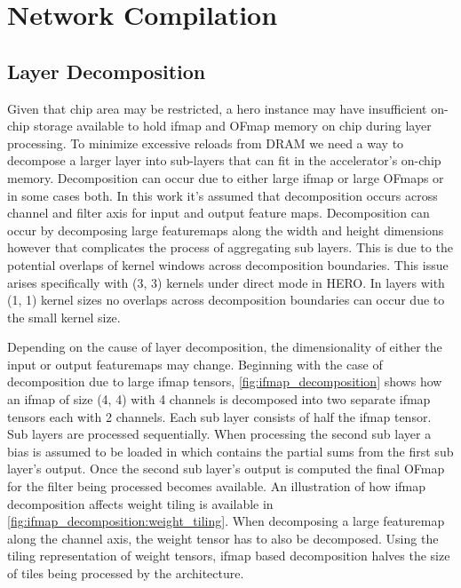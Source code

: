 \chapter{Network Compilation}
\label{chap:net_compile}

\section{Layer Decomposition}
\label{chap:net_compile:layer_decomposition}

Given that chip area may be restricted, a hero instance may have
insufficient on-chip storage available to hold ifmap and OFmap memory on chip
during layer processing. To minimize excessive reloads from DRAM we need a way to decompose a
larger layer into sub-layers that can fit in the accelerator's on-chip memory.
Decomposition can occur due to either large ifmap or large OFmaps or in some cases
both. In this work it's assumed that decomposition occurs across channel and
filter axis for input and output feature maps. Decomposition can occur by
decomposing large featuremaps along the width and height dimensions however that
complicates the process of aggregating sub layers. This is due to the potential overlaps
of kernel windows across decomposition boundaries. This issue arises
specifically with (3, 3) kernels under direct mode in HERO. In layers with (1,
1) kernel sizes no overlaps across decomposition boundaries can occur due to
the small kernel size. 

Depending on the cause of layer decomposition, the dimensionality of either the
input or output featuremaps may change. Beginning with the case of decomposition due
to large ifmap tensors, \autoref{fig:ifmap_decomposition} shows how an ifmap
of size (4, 4) with 4 channels is decomposed into two separate ifmap tensors
each with 2 channels. Each sub layer consists of half the ifmap tensor. Sub
layers are processed sequentially. When
processing the second sub layer a bias is assumed to be loaded in which contains
the partial sums from the first sub layer's output. Once the second sub layer's
output is computed the final OFmap for the filter being processed becomes
available. An illustration of how ifmap decomposition affects weight tiling is
available in \autoref{fig:ifmap_decomposition:weight_tiling}. When decomposing a
large featuremap along the channel axis, the weight tensor has to also be
decomposed. Using the tiling representation of weight tensors, ifmap based
decomposition halves the size of tiles being processed by the architecture. 

